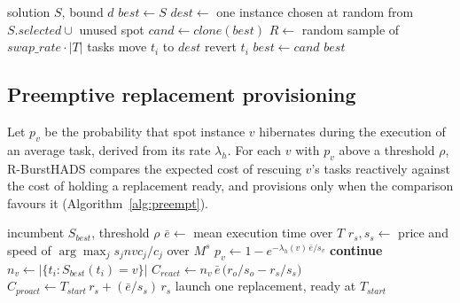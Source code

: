 \documentclass[conference]{IEEEtran}
\begin{document}
\begin{algorithm}[t]
\caption{\textsc{LocalSearch}}
\label{alg:ls}
\begin{algorithmic}[1]
\REQUIRE solution $S$, bound $d$
\STATE $\mathit{best} \leftarrow S$
\STATE $\mathit{dest} \leftarrow$ one instance chosen at random from $S.\mathit{selected}\cup$ unused spot
  \STATE $\mathit{cand} \leftarrow \mathit{clone}(\mathit{best})$
  \STATE $R \leftarrow$ random sample of $\mathit{swap\_rate}\cdot|T|$ tasks
      \STATE move $t_i$ to $\mathit{dest}$
    \ELSE
      \STATE revert $t_i$
    \ENDIF
  \ENDFOR
    \STATE $\mathit{best} \leftarrow \mathit{cand}$
  \ENDIF
\ENDFOR
\RETURN $\mathit{best}$
\end{algorithmic}
\end{algorithm}

\subsection{Preemptive replacement provisioning}

Let $p_v$ be the probability that spot instance $v$ hibernates during the
execution of an average task, derived from its rate $\lambda_h$. For each $v$
with $p_v$ above a threshold $\rho$, R-BurstHADS compares the expected cost of
rescuing $v$'s tasks reactively against the cost of holding a replacement
ready, and provisions only when the comparison favours it
(Algorithm~\ref{alg:preempt}).

\begin{algorithm}[t]
\caption{\textsc{PreemptiveProvision} (Theorem 1)}
\label{alg:preempt}
\begin{algorithmic}[1]
\REQUIRE incumbent $S_{\mathit{best}}$, threshold $\rho$
\STATE $\bar{e} \leftarrow$ mean execution time over $T$
\STATE $r_s, s_s \leftarrow$ price and speed of $\arg\max_j s_j\mathit{nvc}_j/c_j$ over $M^{s}$
  \STATE $p_v \leftarrow 1 - e^{-\lambda_h(v)\,\bar{e}/s_v}$
   \STATE \textbf{continue} \ENDIF
  \STATE $n_v \leftarrow |\{t_i : S_{\mathit{best}}(t_i) = v\}|$
  \STATE $C_{\mathit{react}} \leftarrow n_v\,\bar{e}\,\big(r_{o}/s_{o} - r_s/s_s\big)$
  \STATE $C_{\mathit{proact}} \leftarrow T_{\mathit{start}}\,r_s + (\bar{e}/s_s)\,r_s$
    \STATE launch one replacement, ready at $T_{\mathit{start}}$
  \ENDIF
\ENDFOR
\end{algorithmic}
\end{algorithm}
\end{document}

